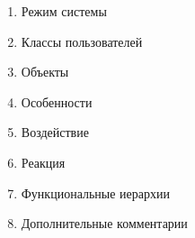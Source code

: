 \documentclass[12pt]{article} %
\begin{document}
\begin{enumerate}
\begin{enumerate}
\begin{enumerate}
  				\item Режим системы
  				\item Классы пользователей
  				\item Объекты
  				\item Особенности
  				\item Воздействие
  				\item Реакция
  				\item Функциональные иерархии
  				\item Дополнительные комментарии
  			\end{enumerate}
  	\end{enumerate}
\end{enumerate}
 
\end{document}

